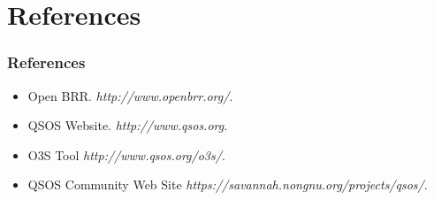 \documentclass{beamer}
\begin{document}

\section{References}

\begin{frame}
 \frametitle{References}
 \begin{itemize}
  \item Open BRR. \textit{http://www.openbrr.org/}.
  \item QSOS Website. \textit{http://www.qsos.org}.
  \item O3S Tool \textit{http://www.qsos.org/o3s/}.
  \item QSOS Community Web Site \textit{https://savannah.nongnu.org/projects/qsos/}.
  \end{itemize}

\end{frame}

\end{document}

